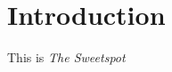\documentclass[dsweetspot.tex]{subfiles}
\begin{document}
\chapter{Introduction}
This is \emph{The \Latex Sweetspot} \cite{schadek:2016:tlss}

\end{document}
